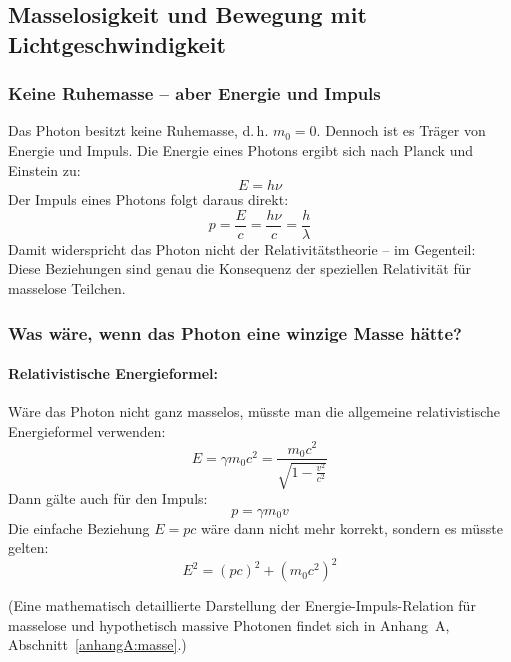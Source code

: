 \subsection{Masselosigkeit und Bewegung mit \newline Lichtgeschwindigkeit}

\subsubsection{Keine Ruhemasse -- aber Energie und Impuls}

Das Photon besitzt keine Ruhemasse, d.\,h. $m_0 = 0$. Dennoch ist es Tr\"ager von Energie und Impuls. Die Energie eines Photons ergibt sich nach Planck und Einstein zu:
\begin{equation}
	E = h \nu
\end{equation}
Der Impuls eines Photons folgt daraus direkt:
\begin{equation}
	p = \frac{E}{c} = \frac{h\nu}{c} = \frac{h}{\lambda}
\end{equation}
Damit widerspricht das Photon nicht der Relativit\"atstheorie -- im Gegenteil: Diese Beziehungen sind genau die Konsequenz der speziellen Relativit\"at f\"ur masselose Teilchen.

\subsubsection{Was w\"are, wenn das Photon eine winzige Masse h\"atte?}

\paragraph*{Relativistische Energieformel:} W\"are das Photon nicht ganz masselos, m\"usste man die allgemeine relativistische Energieformel verwenden:
\begin{equation}
	E = \gamma m_0 c^2 = \frac{m_0 c^2}{\sqrt{1 - \frac{v^2}{c^2}}}
\end{equation}
Dann g\"alte auch f\"ur den Impuls:
\begin{equation}
	p = \gamma m_0 v
\end{equation}
Die einfache Beziehung $E = pc$ w\"are dann nicht mehr korrekt, sondern es m\"usste gelten:
\begin{equation}
	E^2 = (pc)^2 + (m_0 c^2)^2
\end{equation}

(Eine mathematisch detaillierte Darstellung der Energie-Impuls-Relation für masselose und hypothetisch massive Photonen findet sich in Anhang~A, Abschnitt~\ref{anhangA:masse}.)
\newpage
\noindent

